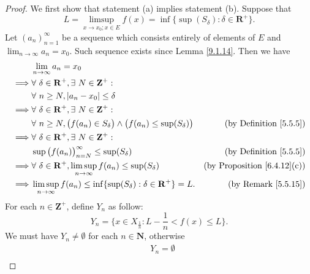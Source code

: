 \begin{proof}
    We first show that statement (a) implies statement (b).
    Suppose that
    \[
        L = \limsup_{x \to x_0 ; x \in E} f(x) = \inf\{\sup(S_\delta) : \delta \in \mathbf{R}^+\}.
    \]
    Let \((a_n)_{n = 1}^\infty\) be a sequence which consists entirely of elements of \(E\) and \(\lim_{n \to \infty} a_n = x_0\).
    Such sequence exists since Lemma \ref{9.1.14}.
    Then we have
    \begin{align*}
                 & \lim_{n \to \infty} a_n = x_0                                                                                                             \\
        \implies & \forall\ \delta \in \mathbf{R}^+, \exists\ N \in \mathbf{Z}^+ :                                                                           \\
                 & \forall\ n \geq N, \abs*{a_n - x_0} \leq \delta                                                                                           \\
        \implies & \forall\ \delta \in \mathbf{R}^+, \exists\ N \in \mathbf{Z}^+ :                                                                           \\
                 & \forall\ n \geq N, \big(f(a_n) \in S_{\delta}\big) \land \big(f(a_n) \leq \sup(S_{\delta})\big) & \text{(by Definition \ref{5.5.5})}      \\
        \implies & \forall\ \delta \in \mathbf{R}^+, \exists\ N \in \mathbf{Z}^+ :                                                                           \\
                 & \sup\big(f(a_n)\big)_{n = N}^\infty \leq \sup(S_{\delta})                                       & \text{(by Definition \ref{5.5.5})}      \\
        \implies & \forall\ \delta \in \mathbf{R}^+, \limsup_{n \to \infty} f(a_n) \leq \sup(S_{\delta})           & \text{(by Proposition \ref{6.4.12}(c))} \\
        \implies & \limsup_{n \to \infty} f(a_n) \leq \inf\{\sup(S_{\delta}) : \delta \in \mathbf{R}^+\} = L.      & \text{(by Remark \ref{5.5.15})}
    \end{align*}
    For each \(n \in \mathbf{Z}^+\), define \(Y_n\) as follow:
    \[
        Y_n = \{x \in X_{\frac{1}{n}} : L - \frac{1}{n} < f(x) \leq L\}.
    \]
    We must have \(Y_n \neq \emptyset\) for each \(n \in \mathbf{N}\), otherwise
    \begin{align*}
                 & Y_n = \emptyset                                                                                         \\

\end{align*}
\end{proof}
